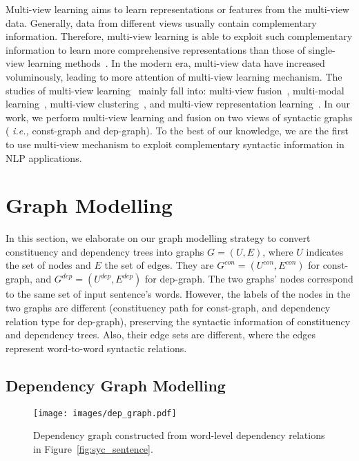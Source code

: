 \documentclass[11pt]{article}
\newcommand{\ie}{\emph{i.e.,}\xspace}
\begin{document}
Multi-view learning aims to learn representations or features from the multi-view data. Generally, data from different views usually contain complementary information. Therefore, multi-view learning is able to exploit such complementary information to learn more comprehensive representations than those of single-view learning methods~\cite{8471216}.
In the modern era, multi-view data have increased voluminously, leading to more attention of multi-view learning mechanism. The studies of multi-view learning~\cite{YAN2021106} mainly fall into: multi-view fusion~\cite{ZHAO201743,sun2013survey}, multi-modal learning~\cite{8103116,8269806}, multi-view clustering~\cite{9395530}, and multi-view representation learning~\cite{8471216,8715409, mane_multi_view_2021}.
In our work, we perform multi-view learning and fusion on two views of syntactic graphs ( \ie const-graph and dep-graph).
To the best of our knowledge, we are the first to use multi-view mechanism to exploit complementary syntactic information in NLP applications.

\section{Graph Modelling}
In this section, we elaborate on our graph modelling strategy to convert constituency and dependency trees into graphs $G=(U,E)$, where $U$ indicates the set of nodes and $E$ the set of edges.
They are $G^{con}=(U^{con},E^{con})$ for const-graph, and $G^{dep}=(U^{dep},E^{dep})$ for dep-graph. The two graphs' nodes correspond to the same set of input sentence's words. 
However, the labels of the nodes in the two graphs are different (constituency path for const-graph, and dependency relation type for dep-graph), preserving the syntactic information of constituency and dependency trees. Also, their edge sets are different, where the edges represent word-to-word syntactic relations.



\subsection{Dependency Graph Modelling}


\begin{figure}
    \centering
    \texttt{[image: images/dep\_graph.pdf]}
    \vspace{-0.5em}
    \caption{Dependency graph constructed from word-level dependency relations in Figure~\ref{fig:syc_sentence}.}
    \label{fig:dep_graph}
    \vspace{-1.5em}
\end{figure}
\end{document}
